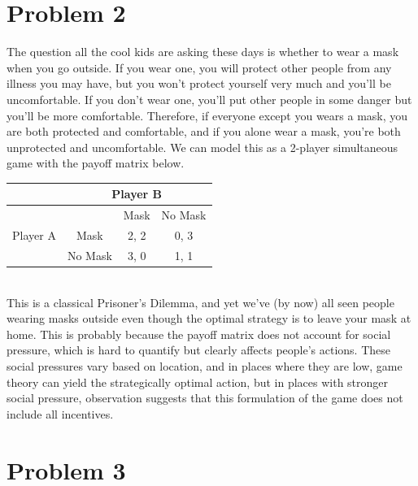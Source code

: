 \documentclass[letterpaper]{article}
\begin{document}
\section{Problem 2}
The question all the cool kids are asking these days is whether to wear a mask when you go outside. If you wear one, you will protect other people from any illness you may have, but you won't protect yourself very much and you'll be uncomfortable. If you don't wear one, you'll put other people in some danger but you'll be more comfortable. Therefore, if everyone except you wears a mask, you are both protected and comfortable, and if you alone wear a mask, you're both unprotected and uncomfortable. We can model this as a 2-player simultaneous game with the payoff matrix below. \\
    \begin{tabular}{|c|c|c|c|}
        \hline
        & \multicolumn{3}{c|}{Player B}       \\ \hline
        \multirow{3}{*}{Player A} & & Mask & No Mask \\ \cline{2-4}
        & Mask  & 2, 2  & 0, 3    \\ \cline{2-4}
        & \multicolumn{1}{c|}{No Mask} & \multicolumn{1}{c|}{3, 0} & 1, 1    \\ \hline
    \end{tabular} \\
    This is a classical Prisoner's Dilemma, and yet we've (by now) all seen people wearing masks outside even though the optimal strategy is to leave your mask at home. This is probably because the payoff matrix does not account for social pressure, which is hard to quantify but clearly affects people's actions. These social pressures vary based on location, and in places where they are low, game theory can yield the strategically optimal action, but in places with stronger social pressure, observation suggests that this formulation of the game does not include all incentives.
\section{Problem 3}
\end{document}
